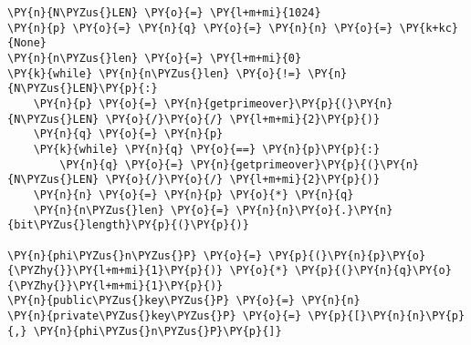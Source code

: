 
\begin{Verbatim}[commandchars=\\\{\}]
\PY{n}{N\PYZus{}LEN} \PY{o}{=} \PY{l+m+mi}{1024}
\PY{n}{p} \PY{o}{=} \PY{n}{q} \PY{o}{=} \PY{n}{n} \PY{o}{=} \PY{k+kc}{None}
\PY{n}{n\PYZus{}len} \PY{o}{=} \PY{l+m+mi}{0}
\PY{k}{while} \PY{n}{n\PYZus{}len} \PY{o}{!=} \PY{n}{N\PYZus{}LEN}\PY{p}{:}
    \PY{n}{p} \PY{o}{=} \PY{n}{getprimeover}\PY{p}{(}\PY{n}{N\PYZus{}LEN} \PY{o}{/}\PY{o}{/} \PY{l+m+mi}{2}\PY{p}{)}
    \PY{n}{q} \PY{o}{=} \PY{n}{p}
    \PY{k}{while} \PY{n}{q} \PY{o}{==} \PY{n}{p}\PY{p}{:}
        \PY{n}{q} \PY{o}{=} \PY{n}{getprimeover}\PY{p}{(}\PY{n}{N\PYZus{}LEN} \PY{o}{/}\PY{o}{/} \PY{l+m+mi}{2}\PY{p}{)}
    \PY{n}{n} \PY{o}{=} \PY{n}{p} \PY{o}{*} \PY{n}{q}
    \PY{n}{n\PYZus{}len} \PY{o}{=} \PY{n}{n}\PY{o}{.}\PY{n}{bit\PYZus{}length}\PY{p}{(}\PY{p}{)}

\PY{n}{phi\PYZus{}n\PYZus{}P} \PY{o}{=} \PY{p}{(}\PY{n}{p}\PY{o}{\PYZhy{}}\PY{l+m+mi}{1}\PY{p}{)} \PY{o}{*} \PY{p}{(}\PY{n}{q}\PY{o}{\PYZhy{}}\PY{l+m+mi}{1}\PY{p}{)}
\PY{n}{public\PYZus{}key\PYZus{}P} \PY{o}{=} \PY{n}{n} 
\PY{n}{private\PYZus{}key\PYZus{}P} \PY{o}{=} \PY{p}{[}\PY{n}{n}\PY{p}{,} \PY{n}{phi\PYZus{}n\PYZus{}P}\PY{p}{]}
\end{Verbatim}